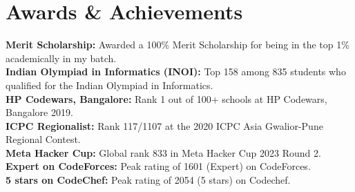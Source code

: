 \documentclass[letterpaper,10pt]{article}
\newcommand{\resumeSubHeadingListStart}{\begin{itemize}[leftmargin=0.15in, label={}]}
\newcommand{\resumeSubHeadingListEnd}{\end{itemize}}
\begin{document}
\section{Awards \& Achievements}
\vspace{2pt}
\resumeSubHeadingListStart
\small{\item{
              \textbf{Merit Scholarship:}{ Awarded a 100\% Merit Scholarship for being in the top 1\% academically in my batch.} \\ \vspace{3pt}
              \textbf{Indian Olympiad in Informatics (INOI):}{ Top 158 among 835 students who qualified for the Indian Olympiad in Informatics.} \\ \vspace{3pt}
              \textbf{HP Codewars, Bangalore:}{ Rank 1 out of 100+ schools at HP Codewars, Bangalore 2019.} \\ \vspace{3pt}
              \textbf{ICPC Regionalist:}{ Rank 117/1107 at the 2020 ICPC Asia Gwalior-Pune Regional Contest.} \\ \vspace{3pt}
              \textbf{Meta Hacker Cup:}{ Global rank 833 in Meta Hacker Cup 2023 Round 2.} \\ \vspace{3pt}
              \textbf{Expert on CodeForces:}{ Peak rating of 1601 (Expert) on CodeForces.} \\ \vspace{3pt}
              \textbf{5 stars on CodeChef:}{ Peak rating of 2054 (5 stars) on Codechef.} \\ \vspace{3pt}
        }}
\resumeSubHeadingListEnd
\end{document}
